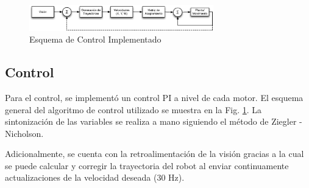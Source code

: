 \documentclass[twocolumn,10pt]{amrob}
\begin{document}

\begin{figure}
  \centering
    \includegraphics[width=8cm]{esquema_PID_motor.eps}
  \caption{Esquema de Control Implementado}
  \label{fig:ctrl}
\end{figure}
\subsection*{Control}
Para el control, se implementó un control PI a nivel de cada motor. El esquema general del algoritmo de control utilizado se muestra en la Fig. \ref{fig:ctrl}. La sintonización de las variables se realiza a mano siguiendo el método de Ziegler - Nicholson. \par
Adicionalmente, se cuenta con la retroalimentación de la visión gracias a la cual se puede calcular y corregir la trayectoria del robot al enviar continuamente actualizaciones de la velocidad deseada (30 Hz). 
\end{document}
